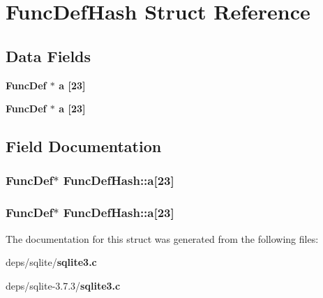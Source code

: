 \section{Func\-Def\-Hash Struct Reference}
\label{structFuncDefHash}
\subsection*{Data Fields}
\begin{CompactItemize}
\item 
\bf{Func\-Def} $\ast$ \bf{a} [23]
\item 
\bf{Func\-Def} $\ast$ \bf{a} [23]
\end{CompactItemize}


\subsection{Field Documentation}
\subsubsection{\setlength{\rightskip}{0pt plus 5cm}\bf{Func\-Def}$\ast$ \bf{Func\-Def\-Hash::a}[23]}\label{structFuncDefHash_7ab49da1a31b7f1cd436ffce9ce388c7}


\subsubsection{\setlength{\rightskip}{0pt plus 5cm}\bf{Func\-Def}$\ast$ \bf{Func\-Def\-Hash::a}[23]}\label{structFuncDefHash_7ab49da1a31b7f1cd436ffce9ce388c7}




The documentation for this struct was generated from the following files:\begin{CompactItemize}
\item 
deps/sqlite/\bf{sqlite3.c}\item 
deps/sqlite-3.7.3/\bf{sqlite3.c}\end{CompactItemize}
